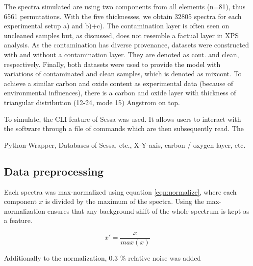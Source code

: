 The spectra simulated are using two components from all elements (n=81), thus 6561 permutations. With the five thicknesses, we obtain 32805 spectra for each experimental setup a) and b)+c).
The contamination layer is often seen on uncleaned samples but, as discussed, does not resemble a factual layer in XPS analysis. As the contamination has diverse provenance, datasets were constructed with and without a contamination layer. They are denoted as cont. and clean, respectively. Finally, both datasets were used to provide the model with variations of contaminated and clean samples, which is denoted as mixcont. 
To achieve a similar carbon and oxide content as experimental data (because of environmental influences), there is a carbon and oxide layer with thickness of triangular distribution (12-24, mode 15) Angstrom on top. 

To simulate, the CLI feature of Sessa was used. It allows users to interact with the software through a file of commands which are then subsequently read. The 

Python-Wrapper, Databases of Sessa, etc., X-Y-axis, carbon / oxygen layer, etc.


\subsection{Data preprocessing}

Each spectra was max-normalized using equation \ref{eqn:normalize}, where each component $x$ is divided by the maximum of the spectra. Using the max-normalization ensures that any background-shift of the whole spectrum is kept as a feature.

\begin{equation}
    x' = \frac{x}{max(x)}
\label{eqn:normalize}
\end{equation}

Additionally to the normalization, 0.3 \% relative noise was added

